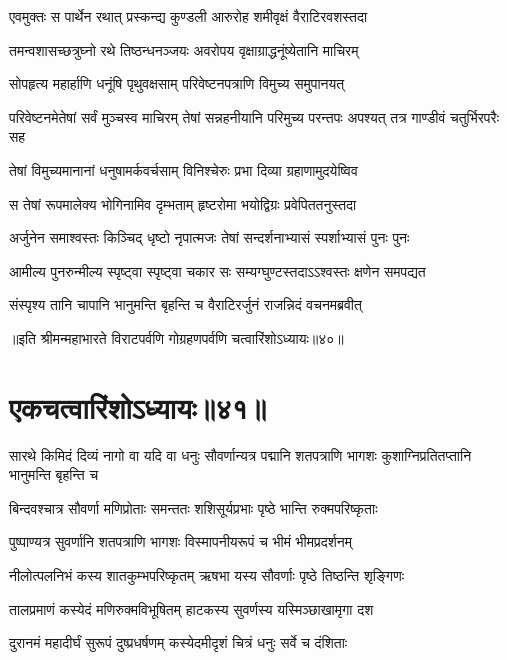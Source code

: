 
\twolineshloka
{एवमुक्तः स पार्थेन रथात् प्रस्कन्द्य कुण्डली}
{आरुरोह शमीवृक्षं वैराटिरवशस्तदा}


\twolineshloka
{तमन्वशासच्छत्रुघ्नो रथे तिष्ठन्धनञ्जयः}
{अवरोपय वृक्षाग्राद्धनूंष्येतानि माचिरम्}


\twolineshloka
{सोपहृत्य महार्हाणि धनूंषि पृथुवक्षसाम्}
{परिवेष्टनपत्राणि विमुच्य समुपानयत्}


\threelineshloka
{परिवेष्टनमेतेषां सर्वं मुञ्चस्व माचिरम्}
{तेषां सन्नहनीयानि परिमुच्य परन्तपः}
{अपश्यत् तत्र गाण्डीवं चतुर्भिरपरैः सह}


\twolineshloka
{तेषां विमुच्यमानानां धनुषामर्कवर्चसाम्}
{विनिश्चेरुः प्रभा दिव्या ग्रहाणामुदयेष्विव}


\twolineshloka
{स तेषां रूपमालेक्य भोगिनामिव दृम्भताम्}
{हृष्टरोमा भयोद्विग्रः प्रवेपिततनुस्तदा}


\twolineshloka
{अर्जुनेन समाश्वस्तः किञ्चिद् धृष्टो नृपात्मजः}
{तेषां सन्दर्शनाभ्यासं स्पर्शाभ्यासं पुनः पुनः}


\twolineshloka
{आमील्य पुनरुन्मील्य स्पृष्ट्वा स्पृष्ट्वा चकार सः}
{सम्यग्घुण्टस्तदाऽऽश्वस्तः क्षणेन समपद्यत}


\twolineshloka
{संस्पृश्य तानि चापानि भानुमन्ति बृहन्ति च}
{वैराटिरर्जुनं राजन्निदं वचनमब्रवीत्}

॥इति श्रीमन्महाभारते विराटपर्वणि गोग्रहणपर्वणि चत्वारिंशोऽध्यायः॥४०॥

\chapter{एकचत्वारिंशोऽध्यायः॥४१॥}

\threelineshloka
{सारथे किमिदं दिव्यं नागो वा यदि वा धनुः}
{सौवर्णान्यत्र पद्मानि शतपत्राणि भागशः}
{कुशाग्निप्रतितप्तानि भानुमन्ति बृहन्ति च}


\twolineshloka
{बिन्दवश्चात्र सौवर्णा मणिप्रोताः समन्ततः}
{शशिसूर्यप्रभाः पृष्ठे भान्ति रुक्मपरिष्कृताः}


\twolineshloka
{पुष्पाण्यत्र सुवर्णानि शतपत्राणि भागशः}
{विस्मापनीयरूपं च भीमं भीमप्रदर्शनम्}


\twolineshloka
{नीलोत्पलनिभं कस्य शातकुम्भपरिष्कृतम्}
{ऋषभा यस्य सौवर्णाः पृष्ठे तिष्ठन्ति शृङ्गिणः}


\twolineshloka
{तालप्रमाणं कस्येदं मणिरुक्मविभूषितम्}
{हाटकस्य सुवर्णस्य यस्मिञ्छाखामृगा दश}

\twolineshloka
{दुरानमं महादीर्घं सुरूपं दुष्प्रधर्षणम्}
{कस्येदमीदृशं चित्रं धनुः सर्वे च दंशिताः}


